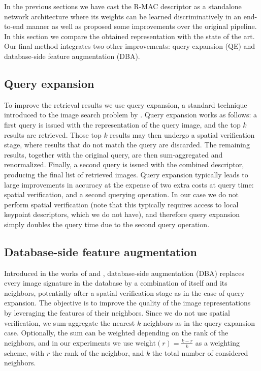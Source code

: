 \documentclass[twocolumn]{svjour3}          \smartqed  \usepackage{graphicx}
\begin{document}
In the previous sections we have cast the R-MAC descriptor as a standalone network architecture where its weights can be learned discriminatively in an end-to-end manner as well as proposed some improvements over the original pipeline.
In this section we compare the obtained representation with the state of the art. Our final method integrates two other improvements: query expansion (QE) and database-side feature augmentation (DBA).

\subsection{Query expansion}
\label{sub:qe}
To improve the retrieval results we use query expansion, a standard technique introduced to the image search problem by \cite{Chum2007}. Query expansion works as follows: a first query is issued with the representation of the query image, and the top $k$ results are retrieved.
Those top $k$ results may then undergo a spatial verification stage, where results that do not match the query are discarded.
The remaining results, together with the original query, are then sum-aggregated and renormalized.
Finally, a second query is issued with the combined descriptor, producing the final list of retrieved images.
Query expansion typically leads to large improvements in accuracy at the expense of two extra costs at query time: spatial verification, and a second querying operation.
In our case we do not perform spatial verification (note that this typically requires access to local keypoint descriptors, which we do not have), and therefore query expansion simply doubles the query time due to the second query operation.

\subsection{Database-side feature augmentation}
\label{sub:dba}
Introduced in the works of \cite{Turcot2009} and \cite{Arandjelovic2012three}, database-side augmentation (DBA) replaces every image signature in the database by a combination of itself and its neighbors, potentially after a spatial verification stage as in the case of query expansion. The objective is to improve the quality of the image representations by leveraging the features of their neighbors.
Since we do not use spatial verification, we sum-aggregate the nearest $k$ neighbors as in the query expansion case.
Optionally, the sum can be weighted depending on the rank of the neighbors, and in our experiments we use $\text{weight}(r) = \frac{k - r}{k}$ as a weighting scheme, with $r$ the rank of the neighbor, and $k$ the total number of considered neighbors.
\end{document}

